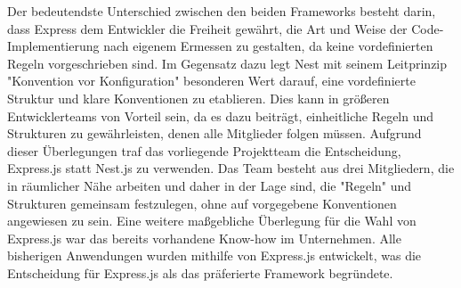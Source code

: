 Der bedeutendste Unterschied zwischen den beiden Frameworks besteht darin, dass Express dem Entwickler die Freiheit gewährt, die Art und Weise der Code-Implementierung nach eigenem Ermessen zu gestalten, da keine vordefinierten Regeln vorgeschrieben sind. Im Gegensatz dazu legt Nest mit seinem Leitprinzip "Konvention vor Konfiguration" besonderen Wert darauf, eine vordefinierte Struktur und klare Konventionen zu etablieren. Dies kann in größeren Entwicklerteams von Vorteil sein, da es dazu beiträgt, einheitliche Regeln und Strukturen zu gewährleisten, denen alle Mitglieder folgen müssen.
\newline
Aufgrund dieser Überlegungen traf das vorliegende Projektteam die Entscheidung, Express.js statt Nest.js zu verwenden. Das Team besteht aus drei Mitgliedern, die in räumlicher Nähe arbeiten und daher in der Lage sind, die "Regeln" und Strukturen gemeinsam festzulegen, ohne auf vorgegebene Konventionen angewiesen zu sein. Eine weitere maßgebliche Überlegung für die Wahl von Express.js war das bereits vorhandene Know-how im Unternehmen. Alle bisherigen Anwendungen wurden mithilfe von Express.js entwickelt, was die Entscheidung für Express.js als das präferierte Framework begründete.
\cite{express_js_vs_nest_js}